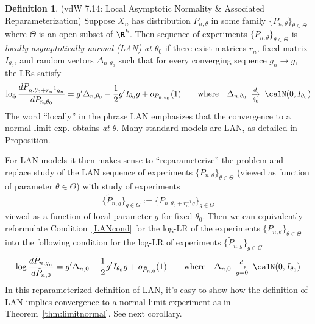 \documentclass[12pt]{article}
\theoremstyle{plain}
\theoremstyle{definition}
\newtheorem{defn}[thm]{Definition}
\theoremstyle{remark}
\newcommand{\ra}{\rightarrow}
\newcommand{\dto}{\xrightarrow{d}}
\begin{document}
\begin{defn}
(vdW 7.14: Local Asymptotic Normality \& Associated Reparameterization)
Suppose $X_n$ has distribution $P_{n,\theta}$ in some family
$\{P_{n,\theta}\}_{\theta\in\Theta}$ where $\Theta$ is an open subset of
$\R^k$.
Then sequence of experiments $\{P_{n,\theta}\}_{\theta\in \Theta}$ is
\emph{locally asymptotically normal (LAN) at $\theta_0$} if there exist
matrices $r_n$, fixed matrix $I_{\theta_0}$, and random vectors
$\Delta_{n,\theta_0}$ such that for every converging sequence $g_n\ra
g$, the LRs satisfy
\begin{align}
  \log \frac{dP_{n,\theta_0+r_n^{-1}g_n}}{dP_{n,\theta_0}}
  =
  g'\Delta_{n,\theta_0}
  -
  \frac{1}{2}
  g' I_{\theta_0} g
  +
  o_{P_{n,\theta_0}}(1)
  \qquad\text{where}\quad
  \Delta_{n,\theta_0}
  \;\underset{\theta_0}{\dto}\;
  \calN(0,I_{\theta_0})
  \label{LANcond}
\end{align}
The word ``locally'' in the phrase LAN emphasizes that the convergence
to a normal limit exp. obtains \emph{at} $\theta$.
Many standard models are LAN, as detailed in Proposition.

For LAN models it then makes sense to ``reparameterize'' the problem and
replace study of the LAN sequence of experiments
$\{P_{n,\theta}\}_{\theta\in\Theta}$ (viewed as function of parameter
$\theta\in\Theta$) with study of experiments
\begin{align*}
  \{\tilde{P}_{n,g}\}_{g\in G}:=\{P_{n,\theta_0+r_n^{-1}g}\}_{g\in G}
\end{align*}
viewed as a function of local parameter $g$ for fixed $\theta_0$.
Then we can equivalently reformulate Condition~\ref{LANcond} for the
log-LR of the experiments $\{P_{n,\theta}\}_{\theta\in\Theta}$ into the
following condition for the log-LR of experiments
$\{\tilde{P}_{n,g}\}_{g\in G}$
\begin{align}
  \log \frac{d\tilde{P}_{n,g_n}}{d\tilde{P}_{n,0}}
  =
  g'\Delta_{n,0}
  -
  \frac{1}{2}
  g' I_{\theta_0} g
  +
  o_{\tilde{P}_{n,0}}(1)
  \qquad\text{where}\quad
  \Delta_{n,0}
  \;\underset{g=0}{\dto}\;
  \calN(0,I_{\theta_0})
  \label{LANcond2}
\end{align}
In this reparameterized definition of LAN, it's easy to show how the
definition of LAN implies convergence to a normal limit experiment as in
Theorem~\ref{thm:limitnormal}.
See next corollary.

\end{defn}
\end{document}
